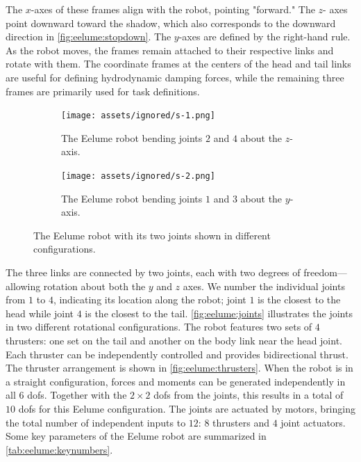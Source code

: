 The $x$-axes of these frames align with the robot, pointing "forward." The $z$-
axes point downward toward the shadow, which also corresponds to the downward 
direction in \autoref{fig:eelume:stopdown}. The $y$-axes are defined by the 
right-hand rule. As the robot moves, the frames remain attached to their 
respective links and rotate with them. The coordinate frames at the centers of 
the head and tail links are useful for defining hydrodynamic damping forces, 
while the remaining three frames are primarily used for task definitions.
\begin{figure}[h!]
    \centering
    \begin{subfigure}{0.45\textwidth}
        \centering
        \texttt{[image: assets/ignored/s-1.png]}
        \caption{The Eelume robot bending joints \(2\) and \(4\) about the $z$-axis.}
        \label{fig:eelume:joints:1}
    \end{subfigure}
    \hfill
    \begin{subfigure}{0.45\textwidth}
        \centering
        \texttt{[image: assets/ignored/s-2.png]}
        \caption{The Eelume robot bending joints \(1\) and \(3\) about the $y$-axis.}
        \label{fig:eelume:joints:2}
    \end{subfigure}
    \caption{The Eelume robot with its two joints shown in different configurations.}
\label{fig:eelume:joints}
\end{figure}
The three links are connected by two joints, each with two degrees of freedom—
allowing rotation about both the $y$ and $z$ axes. We number the individual joints from
\(1\) to \(4\), indicating its location along the robot; joint \(1\) is
the closest to the head while joint \(4\) is the closest to the tail.
\autoref{fig:eelume:joints} illustrates the joints in two different rotational configurations. The robot 
features two sets of $4$ thrusters: one set on the tail and another on the 
body link near the head joint. Each thruster can be independently controlled 
and provides bidirectional thrust. The thruster arrangement is shown in
\autoref{fig:eelume:thrusters}. When the robot is in a straight configuration, 
forces and moments can be generated independently in all $6$ \gls{dof}s. 
Together with the $2 \times 2$ \gls{dof}s from the joints, this results in a 
total of $10$ \gls{dof}s for this Eelume configuration. The joints are 
actuated by motors, bringing the total number of independent inputs to $12$:
$8$ thrusters and $4$ joint actuators. Some key parameters of the Eelume robot
are summarized in \autoref{tab:eelume:keynumbers}.
